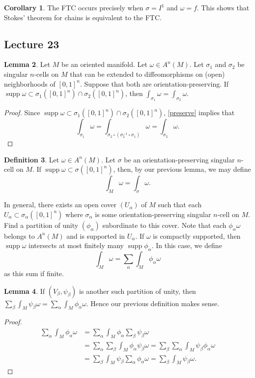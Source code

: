 \documentclass[10pt,letterpaper,cm]{nupset}
\theoremstyle{definition}
\newtheorem{definition}{Definition}[subsection]
\theoremstyle{theorem}
\newtheorem{lemma}[definition]{Lemma}
\newtheorem{corollary}[definition]{Corollary}
\theoremstyle{remark}
\newcommand{\1}{\mathbf{1}}
\newcommand{\0}{\vec 0}
\DeclareMathOperator{\supp}{supp}
\begin{document}
\begin{corollary}
The FTC occurs precisely when $\sigma = I^1$ and $\omega = f$. This shows that Stokes' theorem for chains is equivalent to the FTC.
\end{corollary}

\subsection{Lecture 23}

\begin{lemma}
Let $M$ be an oriented manifold. Let $\omega \in A^n(M)$. Let $\sigma_1$ and $\sigma_2$ be singular $n$-cells on $M$ that can be extended to diffeomorphisms on (open) neighborhoods of $[0,1]^n$. Suppose that both are orientation-preserving. If $\supp \omega \subset  \sigma_1([0,1]^n) \cap \sigma_2([0,1]^n)$, then $\int_{\sigma_1} \omega = \int_{\sigma_2} \omega$.
\end{lemma}
\begin{proof}
Since $\supp \omega \subset  \sigma_1([0,1]^n) \cap \sigma_2([0,1]^n)$, \cref{preserve} implies that $$\int_{\sigma_1} \omega = \int_{\sigma_2 \circ (\sigma_2^{-1} \circ \sigma_1)} \omega  = \int_{\sigma_2} \omega     .$$
\end{proof}

\begin{definition}
Let $\omega \in A^n(M)$. Let $\sigma$ be an orientation-preserving singular $n$-cell on $M$. If $\supp \omega \subset \sigma([0,1]^n)$, then, by our previous lemma, we may define $$\int_M \omega = \int_{\sigma} \omega.$$

In general, there exists an open cover $(U_{\alpha})$ of $M$ such that each $U_{\alpha} \subset \sigma_{\alpha}([0,1]^n)$ where $\sigma_{\alpha}$ is some orientation-preserving singular $n$-cell on $M$. Find a partition of unity $(\phi_{\alpha})$ subordinate to this cover. Note that each $\phi_{\alpha} \omega$ belongs to  $A^n(M)$ and is supported in $U_{\alpha}$. If $\omega$ is compactly supported, then $\supp \omega$ intersects at most finitely many $\supp \phi_{\alpha}$. In this case, we define $$\int_M \omega = \sum_{\alpha}  \int_M \phi_{\alpha} \omega$$ as this sum if finite. 
\end{definition}

\begin{lemma}
If $(V_{\beta}, \psi_{\beta})$ is another such partition of unity, then $\sum_{\beta}\int_M\psi_{\beta} \omega = \sum_{\alpha}  \int_M \phi_{\alpha} \omega$. Hence our previous definition makes sense.
\end{lemma}
\begin{proof}
\begin{align*}
 \sum_{\alpha}  \int_M \phi_{\alpha} \omega
& =  \sum_{\alpha}  \int_M \phi_{\alpha} \sum_{\beta} \psi_{\beta} \omega
\\ & = \sum_{\alpha} \sum_{\beta} \int_M \phi_{\alpha} \psi_{\beta} \omega
 = \sum_{\beta} \sum_{\alpha} \int_M \psi_{\beta} \phi_{\alpha} \omega
\\ & = \sum_{\beta}  \int_M \psi_{\beta} \sum_{\alpha} \phi_{\alpha} \omega
 = \sum_{\beta}\int_M\psi_{\beta} \omega. 
\end{align*}
\end{proof}
\end{document}
